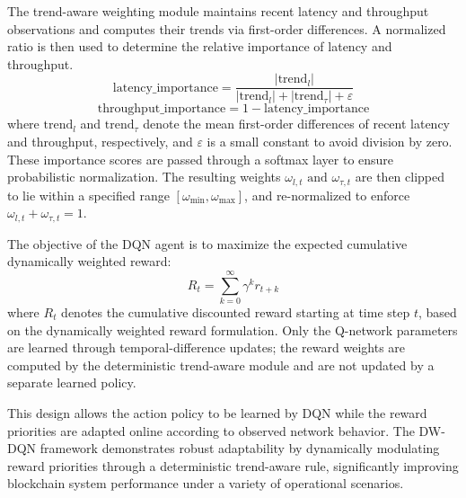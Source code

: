 \documentclass[a4paper,fleqn]{cas-dc}
\begin{document}
The trend-aware weighting module maintains recent latency and throughput observations and computes their trends via first-order differences. A normalized ratio is then used to determine the relative importance of latency and throughput.
\begin{equation}
	\text{latency\_importance} = \frac{|\text{trend}_l|}{|\text{trend}_l| + |\text{trend}_\tau| + \varepsilon}
\end{equation}
\begin{equation}
	 \text{throughput\_importance} = 1 - \text{latency\_importance}
\end{equation}
where \(\text{trend}_l\) and \(\text{trend}_\tau\) denote the mean first-order differences of recent latency and throughput, respectively, and \(\varepsilon\) is a small constant to avoid division by zero. These importance scores are passed through a softmax layer to ensure probabilistic normalization. The resulting weights \(\omega_{l,t} \text{ and } \omega_{\tau,t}\) are then clipped to lie within a specified range \([\omega_{\min}, \omega_{\max}]\), and re-normalized to enforce \(\omega_{l,t} + \omega_{\tau,t} = 1\).

The objective of the DQN agent is to maximize the expected cumulative dynamically weighted reward:
\begin{equation}
	R_t = \sum_{k=0}^\infty \gamma^k r_{t+k}
\end{equation}
where \(R_t\) denotes the cumulative discounted reward starting at time step \(t\), based on the dynamically weighted reward formulation. Only the Q-network parameters are learned through temporal-difference updates; the reward weights are computed by the deterministic trend-aware module and are not updated by a separate learned policy.

This design allows the action policy to be learned by DQN while the reward priorities are adapted online according to observed network behavior. The DW-DQN framework demonstrates robust adaptability by dynamically modulating reward priorities through a deterministic trend-aware rule, significantly improving blockchain system performance under a variety of operational scenarios.

		
\end{document}
